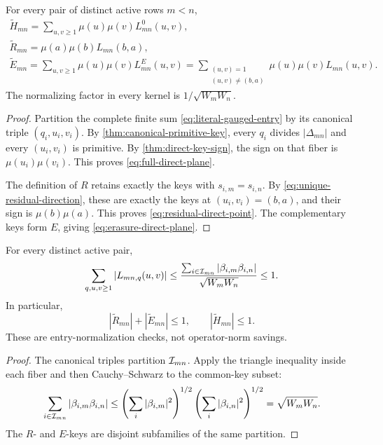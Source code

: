 \begin{theorem}
\label{thm:exact-two-corner-planes}
For every pair of distinct active rows \(m<n\),
\begin{align}
 \boxed{
 \widetilde H_{mn}
 =
 \sum_{u,v\ge1}
 \mu(u)\mu(v)L_{mn}^{0}(u,v),}
 \label{eq:full-direct-plane}\\
 \boxed{
 \widetilde R_{mn}
 =
 \mu(a)\mu(b)L_{mn}(b,a),}
 \label{eq:residual-direct-point}\\
 \boxed{
 \widetilde E_{mn}
 =
 \sum_{u,v\ge1}
 \mu(u)\mu(v)L_{mn}^{E}(u,v)
 =
 \sum_{\substack{(u,v)=1\\(u,v)\ne(b,a)}}
 \mu(u)\mu(v)L_{mn}(u,v).}
 \label{eq:erasure-direct-plane}
\end{align}
The normalizing factor in every kernel is
\(1/\sqrt{W_mW_n}\).
\end{theorem}

\begin{proof}
Partition the complete finite sum
\eqref{eq:literal-gauged-entry} by its canonical triple
\((q_i,u_i,v_i)\).  By \cref{thm:canonical-primitive-key}, every \(q_i\)
divides \(|\Delta_{mn}|\) and every \((u_i,v_i)\) is primitive.  By
\cref{thm:direct-key-sign}, the sign on that fiber is
\(\mu(u_i)\mu(v_i)\).  This proves
\eqref{eq:full-direct-plane}.

The definition of \(R\) retains exactly the keys with
\(s_{i,m}=s_{i,n}\).  By
\eqref{eq:unique-residual-direction}, these are exactly the keys at
\((u_i,v_i)=(b,a)\), and their sign is
\(\mu(b)\mu(a)\).  This proves
\eqref{eq:residual-direct-point}.  The complementary keys form \(E\),
giving \eqref{eq:erasure-direct-plane}.
\end{proof}

\begin{proposition}
\label{prop:atomic-mass-audit}
For every distinct active pair,
\begin{equation}
 \sum_{q,u,v\ge1}|L_{mn,q}(u,v)|
 \le
 \frac{\sum_{i\in\mathcal I_{mn}}
 |\beta_{i,m}\beta_{i,n}|}{\sqrt{W_mW_n}}
 \le1.
 \label{eq:atomic-entry-l1-audit}
\end{equation}
In particular,
\[
 |\widetilde R_{mn}|+|\widetilde E_{mn}|\le1,
 \qquad |\widetilde H_{mn}|\le1.
\]
These are entry-normalization checks, not operator-norm savings.
\end{proposition}

\begin{proof}
The canonical triples partition \(\mathcal I_{mn}\).  Apply the triangle
inequality inside each fiber and then Cauchy--Schwarz to the common-key
subset:
\[
 \sum_{i\in\mathcal I_{mn}}|\beta_{i,m}\beta_{i,n}|
 \le
 \left(\sum_i|\beta_{i,m}|^2\right)^{1/2}
 \left(\sum_i|\beta_{i,n}|^2\right)^{1/2}
 =\sqrt{W_mW_n}.
\]
The \(R\)- and \(E\)-keys are disjoint subfamilies of the same partition.
\end{proof}

